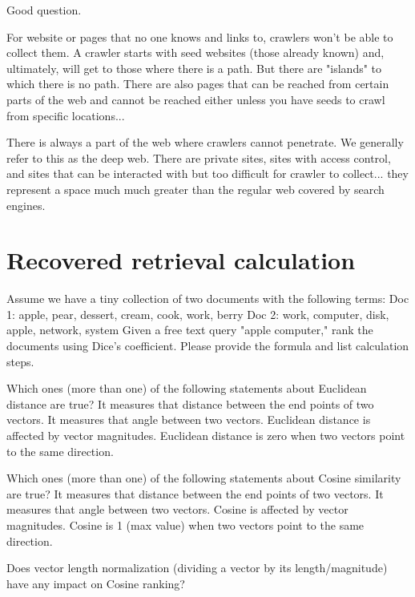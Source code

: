 \documentclass[
  letterpaper,
]{scrbook}
\begin{document}
Good question.

For website or pages that no one knows and links to, crawlers won't be
able to collect them. A ﻿crawler starts with seed websites (those ﻿﻿﻿﻿﻿﻿﻿﻿﻿﻿﻿﻿﻿﻿﻿﻿﻿﻿﻿﻿﻿﻿﻿﻿﻿﻿﻿﻿﻿﻿﻿﻿already
known) and, ultimately, will get to those where there is a path. But
there are "islands" to which there is no path. There are also pages that
can be reached from certain parts of the web and cannot be reached
either unless you have seeds to crawl from specific locations...

There is always a part of the web where crawlers cannot ﻿﻿﻿﻿﻿﻿﻿﻿﻿﻿﻿﻿﻿﻿﻿penetrate. We
generally refer to this as the deep web. There are private sites, sites
with access control, and sites that can be interacted with but too
difficult for crawler to collect... they represent a space much much
greater than the regular web covered by search engines. ﻿

\section*{Recovered retrieval
calculation}\label{recovered-retrieval-calculation}


Assume we have a tiny collection of two documents with the following
terms: Doc 1: apple, pear, dessert, cream, cook, work, berry Doc 2:
work, computer, disk, apple, network, system Given a free text query
"apple computer," rank the documents using Dice's coefficient. Please
provide the formula and list calculation steps.

Which ones (more than one) of the following statements about Euclidean
distance are true? It measures that distance between the end points of
two vectors. It measures that angle between two vectors. Euclidean
distance is affected by vector magnitudes. Euclidean distance is zero
when two vectors point to the same direction.

Which ones (more than one) of the following statements about Cosine
similarity are true? It measures that distance between the end points of
two vectors. It measures that angle between two vectors. Cosine is
affected by vector magnitudes. Cosine is 1 (max value) when two vectors
point to the same direction.

Does vector length normalization (dividing a vector by its
length/magnitude) have any impact on Cosine ranking?
\end{document}
